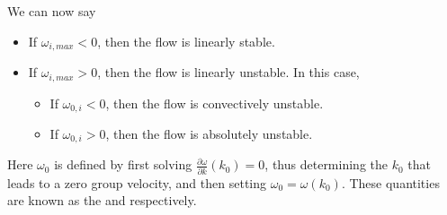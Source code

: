 \documentclass[a4paper]{article}
\begin{document}

%

We can now say
\begin{itemize}
  \item If $\omega_{i, max} < 0$, then the flow is linearly stable.
  \item If $\omega_{i, max} > 0$, then the flow is linearly unstable. In this case,
    \begin{itemize}
      \item If $\omega_{0, i} < 0$, then the flow is convectively unstable.
      \item If $\omega_{0, i} > 0$, then the flow is absolutely unstable.
    \end{itemize}
\end{itemize}
Here $\omega_0$ is defined by first solving $\frac{\partial \omega}{\partial k}(k_0) = 0$, thus determining the $k_0$ that leads to a zero group velocity, and then setting $\omega_0 = \omega(k_0)$. These quantities are known as the  and  respectively.
\end{document}
